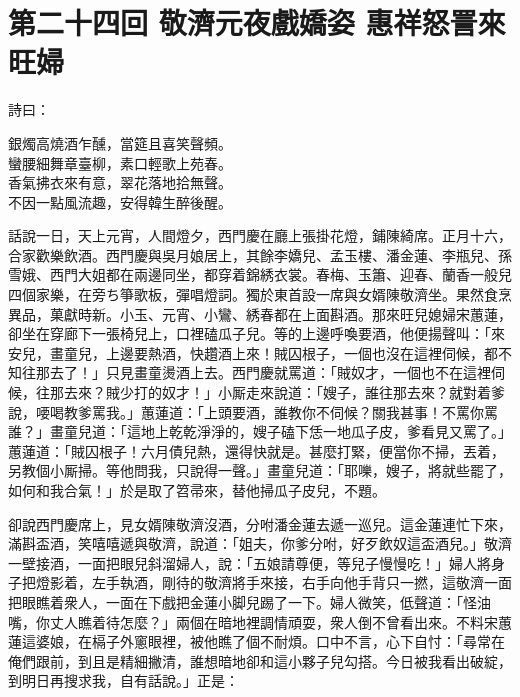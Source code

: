 
\chapter*{第二十四回 敬濟元夜戲嬌姿 惠祥怒詈來旺婦}


詩曰：

\begin{myquote} 
銀燭高燒酒乍醺，當筵且喜笑聲頻。\\蠻腰細舞章臺柳，素口輕歌上苑春。\\香氣拂衣來有意，翠花落地拾無聲。\\不因一點風流趣，安得韓生醉後醒。
\end{myquote} 

話說一日，天上元宵，人間燈夕，西門慶在廳上張掛花燈，鋪陳綺席。正月十六，合家歡樂飲酒。西門慶與吳月娘居上，其餘李嬌兒、孟玉樓、潘金蓮、李瓶兒、孫雪娥、西門大姐都在兩邊同坐，都穿着錦綉衣裳。春梅、玉簫、迎春、蘭香一般兒四個家樂，在旁ち箏歌板，彈唱燈詞。獨於東首設一席與女婿陳敬濟坐。果然食烹異品，菓獻時新。小玉、元宵、小鸞、綉春都在上面斟酒。那來旺兒媳婦宋蕙蓮，卻坐在穿廊下一張椅兒上，口裡磕瓜子兒。等的上邊呼喚要酒，他便揚聲叫：「來安兒，畫童兒，上邊要熱酒，快趲酒上來！賊囚根子，一個也沒在這裡伺候，都不知往那去了！」{}只見畫童燙酒上去。西門慶就罵道：「賊奴才，一個也不在這裡伺候，往那去來？賊少打的奴才！」{}小厮走來說道：「嫂子，誰往那去來？就對着爹說，喓喝教爹罵我。」蕙蓮道：「上頭要酒，誰教你不伺候？關我甚事！不罵你罵誰？」畫童兒道：「這地上乾乾淨淨的，嫂子磕下恁一地瓜子皮，爹看見又罵了。」蕙蓮道：「賊囚根子！六月債兒熱，還得快就是。甚麼打緊，便當你不掃，丟着，另教個小厮掃。等他問我，只說得一聲。」畫童兒道：「耶嚛，嫂子，將就些罷了，如何和我合氣！」於是取了笤帚來，替他掃瓜子皮兒，不題。

卻說西門慶席上，見女婿陳敬濟沒酒，分咐潘金蓮去遞一巡兒。{}{}這金蓮連忙下來，滿斟盃酒，笑嘻嘻遞與敬濟，說道：「姐夫，你爹分咐，好歹飲奴這盃酒兒。」敬濟一壁接酒，一面把眼兒斜溜婦人，說：「五娘請尊便，等兒子慢慢吃！」婦人將身子把燈影着，左手執酒，剛待的敬濟將手來接，右手向他手背只一撚，這敬濟一面把眼瞧着衆人，一面在下戲把金蓮小脚兒踢了一下。婦人微笑，低聲道：「怪油嘴，你丈人瞧着待怎麼？」兩個在暗地裡調情頑耍，衆人倒不曾看出來。{}不料宋蕙蓮這婆娘，在槅子外窻眼裡，被他瞧了個不耐煩。{}口中不言，心下自忖：「尋常在俺們跟前，到且是精細撇清，誰想暗地卻和這小夥子兒勾搭。今日被我看出破綻，到明日再搜求我，自有話說。」正是：

